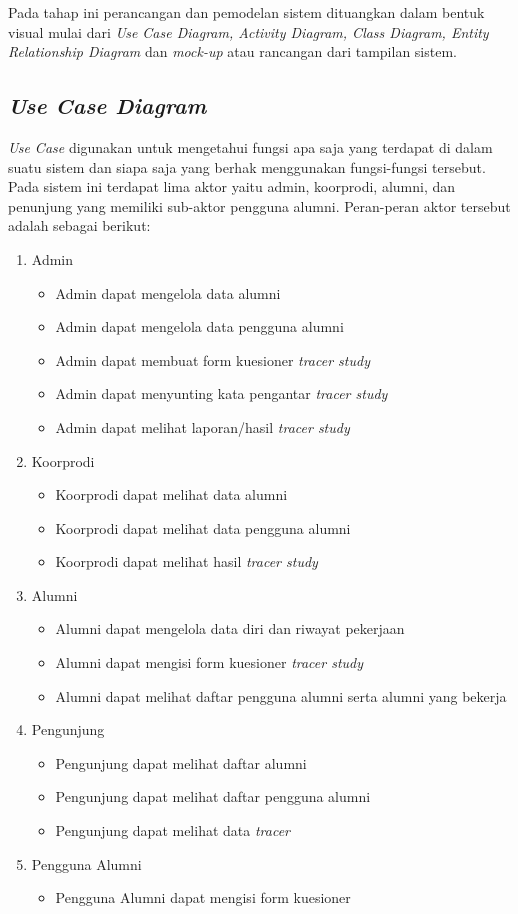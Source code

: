 Pada tahap ini perancangan dan pemodelan sistem dituangkan dalam bentuk visual mulai dari \textit{Use Case Diagram, Activity Diagram, Class Diagram, Entity Relationship Diagram} dan \textit{mock-up} atau rancangan dari tampilan sistem. 

\subsection{\emph{Use Case Diagram}}
\textit{Use Case} digunakan untuk mengetahui fungsi apa saja yang terdapat di dalam suatu sistem dan siapa saja yang berhak menggunakan fungsi-fungsi tersebut. Pada sistem ini terdapat lima aktor yaitu admin, koorprodi, alumni, dan penunjung yang memiliki sub-aktor pengguna alumni. Peran-peran aktor tersebut adalah sebagai berikut:
\begin{enumerate}
	\item Admin
	\begin{itemize}
		\item Admin dapat mengelola data alumni
		\item Admin dapat mengelola data pengguna alumni
		\item Admin dapat membuat form kuesioner \textit{tracer study}
		\item Admin dapat menyunting kata pengantar \textit{tracer study}
		\item Admin dapat melihat laporan/hasil \textit{tracer study} 
	\end{itemize}
	\item Koorprodi 
	\begin{itemize}
		\item Koorprodi dapat melihat data alumni
		\item Koorprodi dapat melihat data pengguna alumni
		\item Koorprodi dapat melihat hasil \textit{tracer study}
	\end{itemize} 
	\item Alumni
	\begin{itemize}
		\item Alumni dapat mengelola data diri dan riwayat pekerjaan
		\item Alumni dapat mengisi form kuesioner \textit{tracer study}
		\item Alumni dapat melihat daftar pengguna alumni serta alumni yang bekerja
	\end{itemize}
	\item Pengunjung
	\begin{itemize}
		\item Pengunjung dapat melihat daftar alumni
		\item Pengunjung dapat melihat daftar pengguna alumni
		\item Pengunjung dapat melihat data \textit{tracer}
	\end{itemize}
	\item Pengguna Alumni
	\begin{itemize}
		\item Pengguna Alumni dapat mengisi form kuesioner
	\end{itemize}
\end{enumerate}

